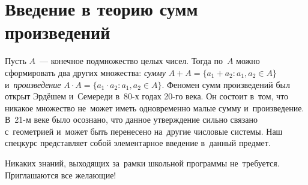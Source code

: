 
\section*{Введение в теорию сумм произведений}



Пусть $A$~--- конечное подмножество целых чисел.
Тогда по~$A$ можно сформировать два других множества:
\emph{сумму} $A + A = \{ a_{1} + a_{2} \colon a_{1}, a_{2} \in A \}$
и~\emph{произведение} $A \cdot A = \{ a_{1} \cdot a_{2} \colon a_{1}, a_{2} \in A \}$.
Феномен сумм произведений был открыт Эрдёшем и~Семереди в~80-х годах
20-го века.
Он состоит в~том, что никакое множество не~может иметь одновременно малые
сумму и~произведение.
В~21-м веке было осознано, что данное утверждение сильно связано с~геометрией
и~может быть перенесено на~другие числовые системы.
Наш спецкурс представляет собой элементарное введение в~данный предмет.

Никаких знаний, выходящих за~рамки школьной программы не~требуется.
Приглашаются все желающие!

